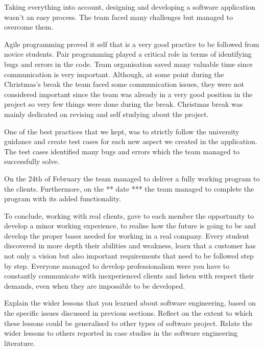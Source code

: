 \documentclass{l3proj}
\begin{document}
Taking everything into account, designing and developing a software application wasn't an easy process. The team faced many challenges but managed to overcome them.

Agile programming proved it self that is a very good practice to be followed from novice students. Pair programming played a critical role in terms of identifying bugs and errors in the code. Team organisation saved many valuable time since communication is very important. Although, at some point during the Christmas's break the team faced some communication issues, they were not considered important since the team was already in a very good position in the project so very few things were done during the break. Christmas break was mainly dedicated on revising and self studying about the project.

One of the best practices that we kept, was to strictly follow the university guidance and create test cases for each new aspect we created in the application. The test cases identified many bugs and errors which the team managed to successfully solve.


On the 24th of February the team managed to deliver a fully working program to the clients. Furthermore, on the ** date *** the team managed to complete the program with its added functionality.

To conclude, working with real clients, gave to each member the opportunity to develop a minor working experience, to realise how the future is going to be and develop the proper bases needed for working in a real company. Every student discovered in more depth their abilities and weakness, learn that a customer has not only a vision but also important requirements that need to be followed step by step. Everyone managed to develop professionalism were you have to constantly communicate with inexperienced clients and listen with respect their demands, even when they are impossible to be developed.









Explain the wider lessons that you learned about software engineering,
based on the specific issues discussed in previous sections.  Reflect
on the extent to which these lessons could be generalised to other
types of software project.  Relate the wider lessons to others
reported in case studies in the software engineering literature.



\end{document}
